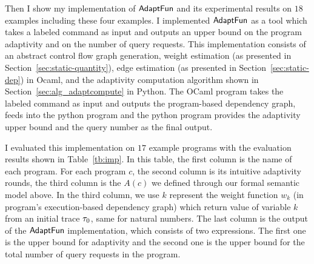 Then I show my implementation of $\textsf{AdaptFun}$ and its experimental 
results on $18$ examples including these four examples.
I implemented $\textsf{AdaptFun}$ as a tool which takes a labeled command as input  
and outputs an upper bound on the program adaptivity and on the number of query requests.
This implementation consists of an 
abstract control flow graph generation, weight estimation (as presented in Section~\ref{sec:static-quantity}),
edge estimation (as presented in Section~\ref{sec:static-dep}) in Ocaml, 
and the adaptivity computation algorithm shown in Section~\ref{sec:alg_adaptcompute} in Python.
The OCaml program takes the labeled command as input and outputs the program-based dependency graph,
feeds into the python program and the python program provides the adaptivity upper bound and the query number as the final output.

I evaluated this implementation on $17$ example programs with the evaluation results shown  in Table~\ref{tb:imp}.
In this table,
the first column is the name of each program.
For each program $c$, the second column is its intuitive adaptivity rounds,
the third column is the $A(c)$ we defined through our formal semantic model above.
In the third column, we use $k$ represent the weight function $w_k$ (in program's execution-based dependency graph) which return value of variable $k$ 
from an initial trace $\mathtt{\tau}_0$, same for natural numbers.
The last column is the output of the $\textsf{AdaptFun}$ implementation, which consists of two expressions.
The first one is the upper bound for adaptivity and the second one is the 
upper bound for the total number of query requests in the program.

